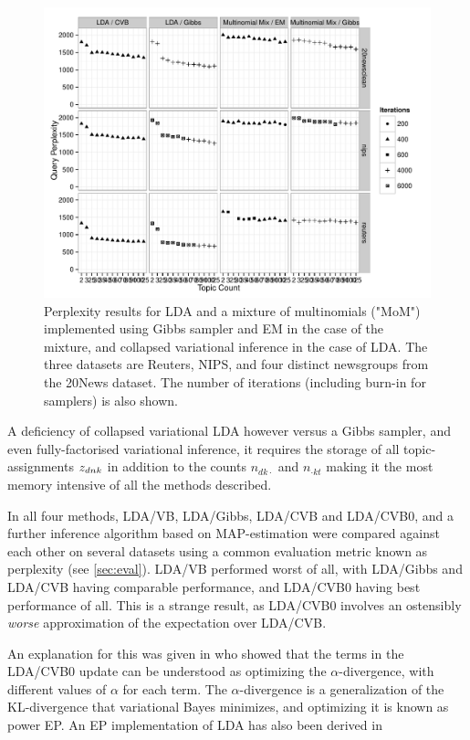 \begin{figure}
  \centering
    \includegraphics[width=\textwidth]{plots/results-2013-03-18-bw.pdf}
  \caption{Perplexity results for LDA and a mixture of multinomials ("MoM") implemented using Gibbs sampler and EM in the case of the mixture, and collapsed variational inference in the case of LDA. The three datasets are Reuters, NIPS, and four distinct newsgroups from the 20News dataset. The number of iterations (including burn-in for samplers) is also shown.}
  \label{fig:nip-reuters-20news-tests}
\end{figure}


A deficiency of collapsed variational LDA however versus a Gibbs sampler, and even fully-factorised variational inference, it requires the storage of all topic-assignments ${ z_{dnk} }$ in addition to the counts $n_{dk\cdot}$ and $n_{\cdot kt}$ making it the most memory intensive of all the methods described.

In \cite{Asuncion2012} all four methods, LDA/VB, LDA/Gibbs, LDA/CVB and LDA/CVB0, and a further inference algorithm based on MAP-estimation were compared against each other on several datasets using a common evaluation metric known as perplexity (see \ref{sec:eval}). LDA/VB performed worst of all, with LDA/Gibbs and LDA/CVB having comparable performance, and LDA/CVB0 having best performance of all. This is a strange result, as LDA/CVB0 involves an ostensibly \emph{worse} approximation of the expectation over LDA/CVB. 

An explanation for this was given in\cite{Sato2012} who showed that the terms in the LDA/CVB0 update can be understood as optimizing the $\alpha$-divergence\cite{Minka2005}, with different values of $\alpha$ for each term. The $\alpha$-divergence is a generalization of the KL-divergence that variational Bayes minimizes, and optimizing it is known as power EP. An EP implementation of LDA has also been derived in \cite{Minka2002}

